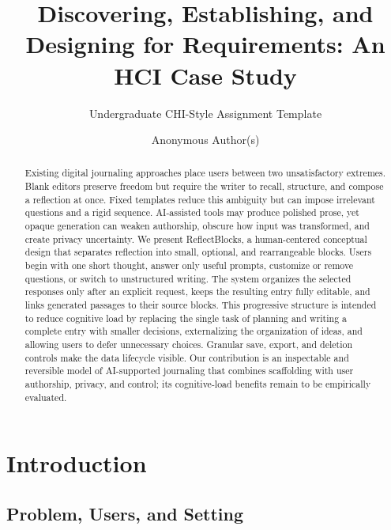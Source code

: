 \documentclass[sigconf,nonacm]{acmart}
\begin{document}
\title{Discovering, Establishing, and Designing for Requirements: An HCI Case Study}
\subtitle{Undergraduate CHI-Style Assignment Template}

\author{Anonymous Author(s)}

\begin{abstract}
Existing digital journaling approaches place users between two
unsatisfactory extremes. Blank editors preserve freedom but require the writer
to recall, structure, and compose a reflection at once. Fixed templates
reduce this ambiguity but can impose irrelevant questions and a rigid sequence.
AI-assisted tools may produce polished prose, yet opaque generation can
weaken authorship, obscure how input was transformed, and create
privacy uncertainty. We present ReflectBlocks, a human-centered conceptual
design that separates reflection into small, optional, and rearrangeable blocks.
Users begin with one short thought, answer only useful prompts, customize or
remove questions, or switch to unstructured writing. The system organizes the
selected responses only after an explicit request, keeps the resulting entry
fully editable, and links generated passages to their source blocks. This
progressive structure is intended to reduce cognitive load by replacing the
single task of planning and writing a complete entry with smaller decisions,
externalizing the organization of ideas, and allowing users to defer unnecessary
choices. Granular save, export, and deletion controls make the
data lifecycle visible. Our contribution is an inspectable and reversible model
of AI-supported journaling that combines scaffolding with user authorship,
privacy, and control; its cognitive-load benefits remain to be empirically
evaluated.
\end{abstract}


\maketitle

\section{Introduction}

\subsection{Problem, Users, and Setting}
\end{document}

